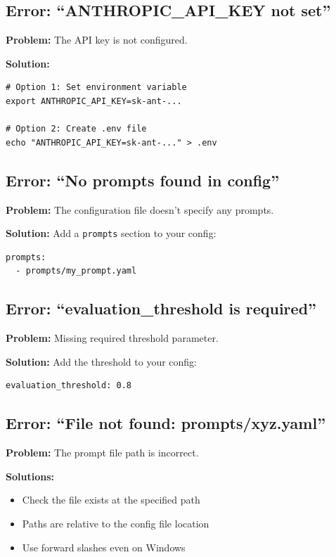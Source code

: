 \documentclass[11pt,a4paper]{report}
\begin{document}
\subsection{Error: ``ANTHROPIC\_API\_KEY not set''}

\textbf{Problem:} The API key is not configured.

\textbf{Solution:}
\begin{lstlisting}[style=bash]
# Option 1: Set environment variable
export ANTHROPIC_API_KEY=sk-ant-...

# Option 2: Create .env file
echo "ANTHROPIC_API_KEY=sk-ant-..." > .env
\end{lstlisting}

\subsection{Error: ``No prompts found in config''}

\textbf{Problem:} The configuration file doesn't specify any prompts.

\textbf{Solution:} Add a \texttt{prompts} section to your config:
\begin{lstlisting}[style=yaml]
prompts:
  - prompts/my_prompt.yaml
\end{lstlisting}

\subsection{Error: ``evaluation\_threshold is required''}

\textbf{Problem:} Missing required threshold parameter.

\textbf{Solution:} Add the threshold to your config:
\begin{lstlisting}[style=yaml]
evaluation_threshold: 0.8
\end{lstlisting}

\subsection{Error: ``File not found: prompts/xyz.yaml''}

\textbf{Problem:} The prompt file path is incorrect.

\textbf{Solutions:}
\begin{itemize}
    \item Check the file exists at the specified path
    \item Paths are relative to the config file location
    \item Use forward slashes even on Windows
\end{itemize}
\end{document}
